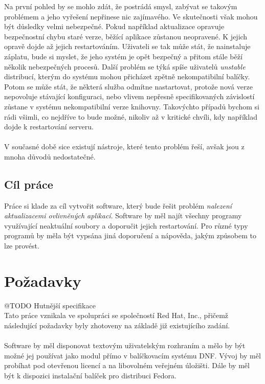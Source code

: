 \documentclass[10pt,a4paper]{article}
\begin{document}
		Na první pohled by se mohlo zdát, že postrádá smysl, zabývat se takovým problémem a jeho vyřešení nepřinese nic zajímavého. Ve skutečnosti však mohou být důsledky velmi nebezpečné. Pokud například aktualizace opravuje bezpečnostní chybu staré verze, běžící aplikace zůstanou neopravené. K jejich opravě dojde až jejich restartováním. Uživateli se tak může stát, že nainstaluje záplatu, bude si myslet, že jeho systém je opět bezpečný a přitom stále běží několik nebezpečných procesů.
		Další problém se týká spíše uživatelů \textit{unstable} distribucí, kterým do systému mohou přicházet zpětně nekompatibilní balíčky. Potom se může stát, že některá služba odmítne nastartovat, protože nová verze nepovoluje stávající konfiguraci, nebo vlivem nepřesně specifikovaných závislostí zůstane v systému nekompatibilní verze knihovny. Takovýchto případů bychom si rádi všimli, co nejdříve to bude možné, nikoliv až v kritické chvíli, kdy například dojde k restartování serveru.
		\\
		\\
		V současné době sice existují nástroje, které tento problém řeší, avšak jsou z mnoha důvodů nedostatečné.

		\subsection{Cíl práce}
		Práce si klade za cíl vytvořit software, který bude řešit problém \textit{nalezení aktualizacemi ovlivněných aplikací}. Software by měl najít všechny programy využívající neaktuální soubory a doporučit jejich restartování. Pro různé typy programů by měla být vypsána jiná doporučení a nápověda, jakým způsobem to lze provést.

		\section{Požadavky}
		@TODO Hutnější specifikace\\

		Tato práce vznikala ve spolupráci se společností Red Hat, Inc., přičemž následující požadavky byly zhotoveny na základě již existujícího zadání.
		\\
		\\
		Software by měl disponovat textovým uživatelským rozhraním a mělo by být možné jej používat jako modul přímo v balíčkovacím systému DNF\@. Vývoj by měl probíhat pod otevřenou licencí a na libovolném veřejném úložišti. Dále by měl být k dispozici instalační balíček pro distribuci Fedora.
\end{document}
